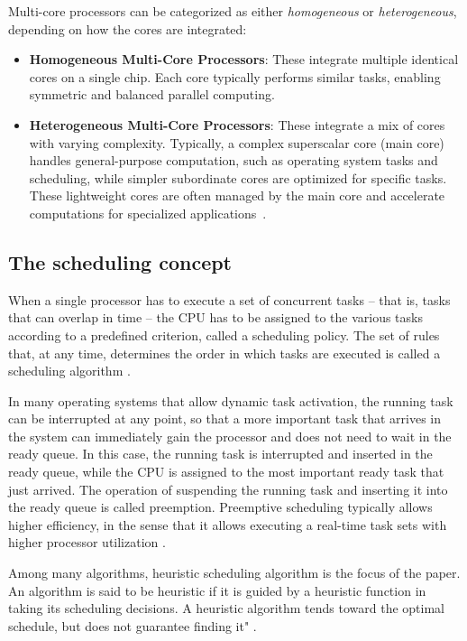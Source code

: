 \documentclass[conference]{IEEEtran}
\begin{document}
Multi-core processors can be categorized as either \textit{homogeneous} or \textit{heterogeneous}, depending on how the cores are integrated:
\begin{itemize}
    \item \textbf{Homogeneous Multi-Core Processors}: These integrate multiple identical cores on a single chip. Each core typically performs similar tasks, enabling symmetric and balanced parallel computing.
    \item \textbf{Heterogeneous Multi-Core Processors}: These integrate a mix of cores with varying complexity. Typically, a complex superscalar core (main core) handles general-purpose computation, such as operating system tasks and scheduling, while simpler subordinate cores are optimized for specific tasks. These lightweight cores are often managed by the main core and accelerate computations for specialized applications~\cite{6234619}.
\end{itemize}



\subsection{The scheduling concept}
\label{subsec: scheduling approach on multicore architecture}
When a single processor has to execute a set of concurrent tasks – that is, tasks that can overlap in time – the CPU has to be assigned to the various tasks according to a predefined criterion, called a scheduling policy. The set of rules that, at any time, determines the order in which tasks are executed is called a scheduling algorithm \cite{butazo99}.

In many operating systems that allow dynamic task activation, the running task can be interrupted at any point, so that a more important task that arrives in the system can immediately gain the processor and does not need to wait in the ready queue. In this case, the running task is interrupted and inserted in the ready queue, while the CPU is assigned to the most important ready task that just arrived. The operation of suspending the running task and inserting it into the ready queue is called preemption. Preemptive scheduling typically allows higher efficiency, in the sense that it allows executing a real-time task sets with higher processor utilization \cite{butazo99}.

Among many algorithms, heuristic scheduling algorithm is the focus of the paper. An algorithm is said to be heuristic if it is guided by a heuristic function in taking its scheduling decisions. A heuristic algorithm tends toward the optimal schedule, but does not guarantee finding it" \cite{butazo99}.
\end{document}
